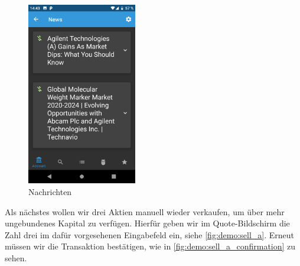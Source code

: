 \documentclass[a4paper]{article}
\begin{document}
\begin{figure}[H]
	\centering
	\includegraphics[height=8cm,keepaspectratio]{./images/demo/news.png}
	\caption{Nachrichten}
	\label{fig:demo:news}
\end{figure}

Als nächstes wollen wir drei Aktien manuell wieder verkaufen, um über mehr ungebundenes Kapital zu verfügen. Hierfür geben wir im Quote-Bildschirm die Zahl drei im dafür vorgesehenen Eingabefeld ein, siehe \autoref{fig:demo:sell_a}. Erneut müssen wir die Transaktion bestätigen, wie in \autoref{fig:demo:sell_a_confirmation} zu sehen.
\end{document}
